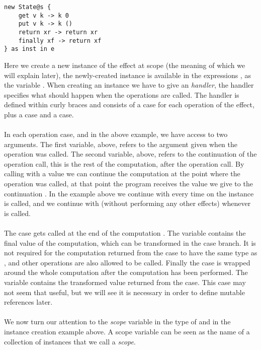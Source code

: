 \begin{verbatim}
new State@s {
	get v k -> k 0
	put v k -> k ()
	return xr -> return xr
	finally xf -> return xf
} as inst in e
\end{verbatim}
Here we create a new instance of the  effect at scope  (the meaning of which we will explain later), the newly-created instance is available in the expressions , as the variable .
When creating an instance we have to give an \emph{handler}, the handler specifies what should happen when the operations are called.
The handler is defined within curly braces and consists of a case for each operation of the effect, plus a  case and a  case.
\\\\
In each operation case,  and  in the above example, we have access to two arguments.
The first variable,  above, refers to the argument given when the operation was called.
The second variable,  above, refers to the continuation of the operation call, this is the rest of the computation, after the operation call.
By calling  with a value we can continue the computation at the point where the operation was called, at that point the program receives the value we give to the continuation .
In the example above we continue with  every time  on the instance  is called, and we continue with \ident{()} (without performing any other effects) whenever  is called.
\\\\
The  case gets called at the end of the computation .
The variable  contains the final value of the computation, which can be transformed in the case branch.
It is not required for the computation returned from the case to have the same type as , and other operations are also allowed to be called.
Finally the  case is wrapped around the whole computation  after the  computation has been performed.
The variable  contains the transformed value returned from the  case.
This case may not seem that useful, but we will see it is necessary in order to define mutable references later.
\\\\
We now turn our attention to the \emph{scope} variable  in the type of  and in the instance creation example above.
A scope variable can be seen as the name of a collection of instances that we call a \emph{scope}.

